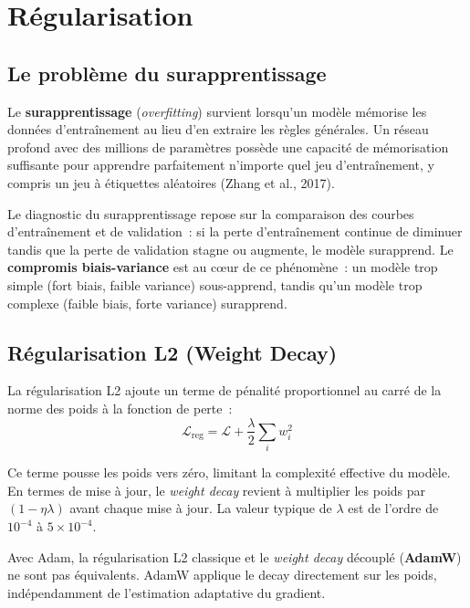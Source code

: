 \documentclass[a4paper,11pt,twoside]{book}
\begin{document}
\chapter{Régularisation}

\section{Le problème du surapprentissage}

Le \textbf{surapprentissage} (\textit{overfitting}) survient lorsqu'un modèle mémorise les données d'entraînement au lieu d'en extraire les règles générales. Un réseau profond avec des millions de paramètres possède une capacité de mémorisation suffisante pour apprendre parfaitement n'importe quel jeu d'entraînement, y compris un jeu à étiquettes aléatoires (Zhang et al., 2017).

Le diagnostic du surapprentissage repose sur la comparaison des courbes d'entraînement et de validation~: si la perte d'entraînement continue de diminuer tandis que la perte de validation stagne ou augmente, le modèle surapprend. Le \textbf{compromis biais-variance} est au c\oe ur de ce phénomène~: un modèle trop simple (fort biais, faible variance) sous-apprend, tandis qu'un modèle trop complexe (faible biais, forte variance) surapprend.

\section{Régularisation L2 (Weight Decay)}

La régularisation L2 ajoute un terme de pénalité proportionnel au carré de la norme des poids à la fonction de perte~:
\[
\mathcal{L}_\text{reg} = \mathcal{L} + \frac{\lambda}{2} \sum_i w_i^2
\]

Ce terme pousse les poids vers zéro, limitant la complexité effective du modèle. En termes de mise à jour, le \textit{weight decay} revient à multiplier les poids par $(1 - \eta\lambda)$ avant chaque mise à jour. La valeur typique de $\lambda$ est de l'ordre de $10^{-4}$ à $5 \times 10^{-4}$.

\begin{notebox}[Attention]
Avec Adam, la régularisation L2 classique et le \textit{weight decay} découplé (\textbf{AdamW}) ne sont pas équivalents. AdamW applique le decay directement sur les poids, indépendamment de l'estimation adaptative du gradient.
\end{notebox}
\end{document}
